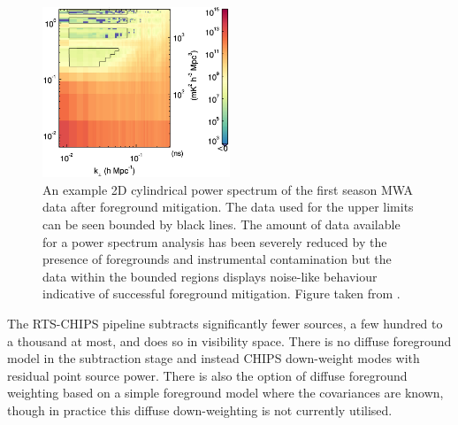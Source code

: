 \begin{figure}
\begin{center}
    \includegraphics[width=0.5\textwidth]{Images/apjaa3b64f13_hr.jpg}
\end{center}
    \caption{An example 2D cylindrical power spectrum of the first season MWA data after foreground mitigation. The data used for the upper limits can be seen bounded by black lines. The amount of data available for a power spectrum analysis has been severely reduced by the presence of foregrounds and instrumental contamination but the data within the bounded regions displays noise-like behaviour indicative of successful foreground mitigation. Figure taken from \citet{Beardsley2016ApJ...833..102B}.}
    \label{fig:masks}
\end{figure}

The RTS-CHIPS pipeline subtracts significantly fewer sources, a few hundred to a thousand at most, and does so in visibility space. There is no diffuse foreground model in the subtraction stage and instead CHIPS down-weight modes with residual point source power. There is also the option of diffuse foreground weighting based on a simple foreground model where the covariances are known, though in practice this diffuse down-weighting is not currently utilised.

